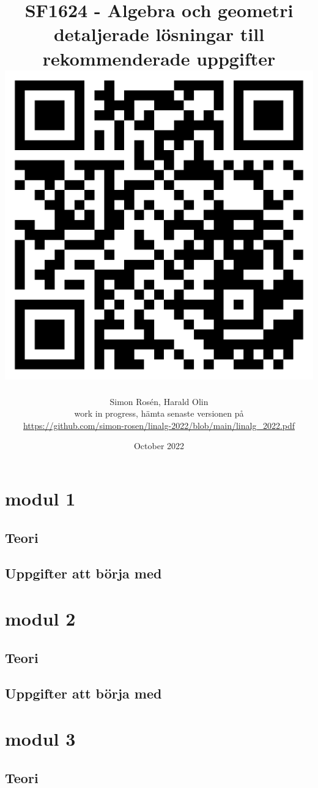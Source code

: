 \documentclass{article}
\title{SF1624 - Algebra och geometri\\ {\large detaljerade lösningar till rekommenderade uppgifter}\\
\bigskip\includegraphics[scale=0.25]{qrcode.png}}
\author{Simon Rosén, Harald Olin
\\{\small work in progress, hämta senaste versionen på}
\\ {\small \url{https://github.com/simon-rosen/linalg-2022/blob/main/linalg_2022.pdf}}}
\date{October 2022}
\begin{document}
\maketitle

\newpage 

\tableofcontents

\newpage

\section{modul 1}


\subsection{Teori}


\subsection{Uppgifter att börja med}


\section{modul 2}
\subsection{Teori}


\subsection{Uppgifter att börja med}


\section{modul 3}
\subsection{Teori}

\end{document}
